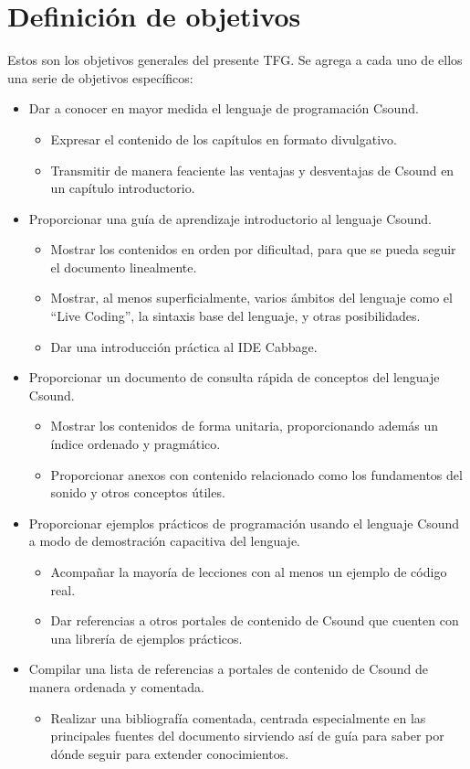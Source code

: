 \chapter{Definici\'on de objetivos}\label{defobjetivos}
Estos son los objetivos generales del presente TFG. Se agrega a cada uno de ellos una serie de objetivos específicos:

\begin{itemize}
\item Dar a conocer en mayor medida el lenguaje de programación Csound.
	\begin{itemize}
	\item Expresar el contenido de los capítulos en formato divulgativo.
	\item Transmitir de manera feaciente las ventajas y desventajas de Csound en un capítulo introductorio.
	\end{itemize}
\item Proporcionar una guía de aprendizaje introductorio al lenguaje Csound.
	\begin{itemize}
	\item Mostrar los contenidos en orden por dificultad, para que se pueda seguir el documento linealmente.
	\item Mostrar, al menos superficialmente, varios ámbitos del lenguaje como el ``Live Coding'', la sintaxis base del lenguaje, y otras posibilidades. 
	\item Dar una introducción práctica al IDE Cabbage.
	\end{itemize}
\item Proporcionar un documento de consulta rápida de conceptos del lenguaje Csound.
	\begin{itemize}
	\item Mostrar los contenidos de forma unitaria, proporcionando además un índice ordenado y pragmático.
	\item Proporcionar anexos con contenido relacionado como los fundamentos del sonido y otros conceptos útiles.
	\end{itemize}
\item Proporcionar ejemplos prácticos de programación usando el lenguaje Csound a modo de demostración capacitiva del lenguaje.
	\begin{itemize}
	\item Acompañar la mayoría de lecciones con al menos un ejemplo de código real.
	\item Dar referencias a otros portales de contenido de Csound que cuenten con una librería de ejemplos prácticos.
	\end{itemize}
\item Compilar una lista de referencias a portales de contenido de Csound de manera ordenada y comentada.
	\begin{itemize}
	\item Realizar una bibliografía comentada, centrada especialmente en las principales fuentes del documento sirviendo así de guía para saber por dónde seguir para extender conocimientos.
	\end{itemize}
\end{itemize}
